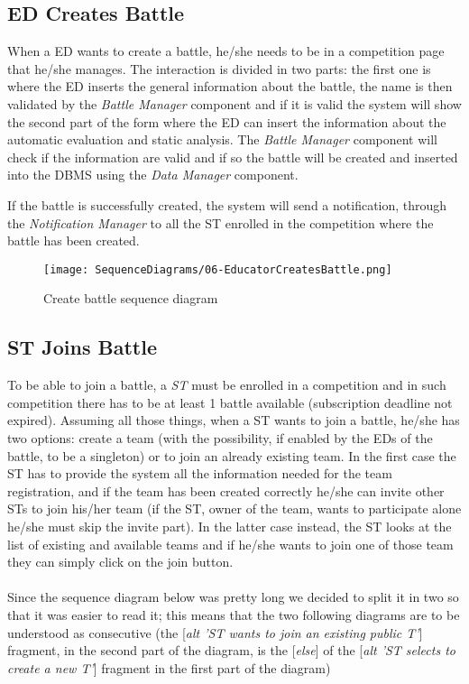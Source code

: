 \subsection*{ED Creates Battle}
\label{ss:create_battle_diagram}
When a ED wants to create a battle, he/she needs to be in a competition page that he/she manages. The interaction is divided in two parts: the first one is where the ED inserts the general information about the battle, the name is then validated by the \textit{Battle Manager} component and if it is valid the system will show the second part of the form where the ED can insert the information about the automatic evaluation and static analysis. The \textit{Battle Manager} component will check if the information are valid and if so the battle will be created and inserted into the DBMS using the \textit{Data Manager} component.

If the battle is successfully created, the system will send a notification, through the \textit{Notification Manager} to all the ST enrolled in the competition where the battle has been created.

\begin{figure}[H]
  \centering
  \texttt{[image: SequenceDiagrams/06-EducatorCreatesBattle.png]}
  \caption{Create battle sequence diagram}
  \label{fig:create_battle_diagramn}
\end{figure}

\subsection*{ST Joins Battle}
To be able to join a battle, a \textit{ST} must be enrolled in a competition and in such competition there has to be at least 1 battle available (subscription deadline not expired). Assuming all those things, when a ST wants to join a battle, he/she has two options: create a team (with the possibility, if enabled by the EDs of the battle, to be a singleton) or to join an already existing team. In the first case the ST has to provide the system all the information needed for the team registration, and if the team has been created correctly he/she can invite other STs to join his/her team (if the ST, owner of the team, wants to participate alone he/she must skip the invite part). In the latter case instead, the ST looks at the list of existing and available teams and if he/she wants to join one of those team they can simply click on the join button. \\ \\
Since the sequence diagram below was pretty long we decided to split it in two so that it was easier to read it; this means that the two following diagrams are to be understood as consecutive (the [\textit{alt 'ST wants to join an existing public T'}] fragment, in the second part of the diagram, is the [\textit{else}] of the [\textit{alt 'ST selects to create a new T'}] fragment in the first part of the diagram)


